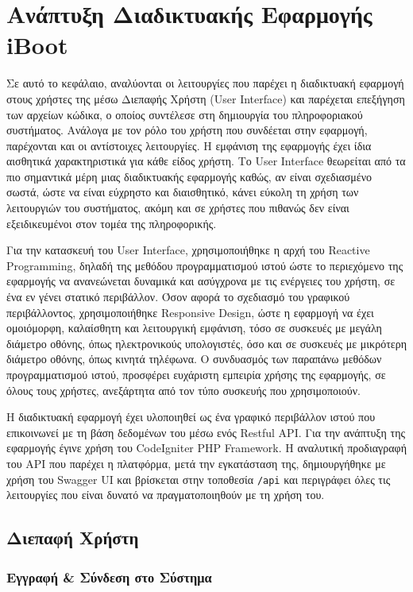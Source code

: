 \chapter{Ανάπτυξη Διαδικτυακής Εφαρμογής iBoot}
Σε αυτό το κεφάλαιο, αναλύονται οι λειτουργίες που παρέχει η διαδικτυακή εφαρμογή στους χρήστες της μέσω Διεπαφής Χρήστη (User Interface) και παρέχεται επεξήγηση των αρχείων κώδικα, ο οποίος συντέλεσε στη δημιουργία του πληροφοριακού συστήματος. Ανάλογα με τον ρόλο του χρήστη που συνδέεται στην εφαρμογή, παρέχονται και οι αντίστοιχες λειτουργίες. Η εμφάνιση της εφαρμογής έχει ίδια αισθητικά χαρακτηριστικά για κάθε είδος χρήστη. Το User Interface θεωρείται από τα πιο σημαντικά μέρη μιας διαδικτυακής εφαρμογής καθώς, αν είναι σχεδιασμένο σωστά, ώστε να είναι εύχρηστο και διαισθητικό, κάνει εύκολη τη χρήση των λειτουργιών του συστήματος, ακόμη και σε χρήστες που πιθανώς δεν είναι εξειδικευμένοι στον τομέα της πληροφορικής.

Για την κατασκευή του User Interface, χρησιμοποιήθηκε η αρχή του Reactive Programming, δηλαδή της μεθόδου προγραμματισμού ιστού ώστε το περιεχόμενο της εφαρμογής να ανανεώνεται δυναμικά και ασύγχρονα με τις ενέργειες του χρήστη, σε ένα εν γένει στατικό περιβάλλον. Όσον αφορά το σχεδιασμό του γραφικού περιβάλλοντος, χρησιμοποιήθηκε Responsive Design, ώστε η εφαρμογή να έχει ομοιόμορφη, καλαίσθητη και λειτουργική εμφάνιση, τόσο σε συσκευές με μεγάλη διάμετρο οθόνης, όπως ηλεκτρονικούς υπολογιστές, όσο και σε συσκευές με μικρότερη διάμετρο οθόνης, όπως κινητά τηλέφωνα. Ο συνδυασμός των παραπάνω μεθόδων προγραμματισμού ιστού, προσφέρει ευχάριστη εμπειρία χρήσης της εφαρμογής, σε όλους τους χρήστες, ανεξάρτητα από τον τύπο συσκευής που χρησιμοποιούν.

Η διαδικτυακή εφαρμογή έχει υλοποιηθεί ως ένα γραφικό περιβάλλον ιστού που επικοινωνεί με τη βάση δεδομένων του μέσω ενός Restful API. Για την ανάπτυξη της εφαρμογής έγινε χρήση του CodeIgniter PHP Framework. Η αναλυτική προδιαγραφή του API που παρέχει η πλατφόρμα, μετά την εγκατάσταση της, δημιουργήθηκε με χρήση του Swagger UI και βρίσκεται στην τοποθεσία \texttt{/api} και περιγράφει όλες τις λειτουργίες που είναι δυνατό να πραγματοποιηθούν με τη χρήση του.

\section{Διεπαφή Χρήστη}

\subsection{Εγγραφή \& Σύνδεση στο Σύστημα}

